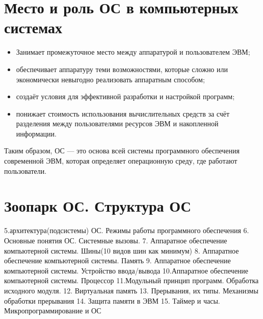 \documentclass[a5paper, 10pt, notitlepage, pdftex,headsepline]{scrartcl}
\begin{document}
\section{Место и роль ОС в компьютерных системах}
  \begin{itemize}
    \item Занимает промежуточное место между аппаратурой и пользователем
      ЭВМ;
    \item обеспечивает аппаратуру теми возможностями, которые сложно или
      экономически невыгодно реализовать аппаратным способом;
    \item создаёт условия для эффективной разработки и настройкой
      программ;
    \item понижает стоимость использования вычислительных средств за
      счёт разделения между пользователями ресурсов ЭВМ и накопленной
      информации.
  \end{itemize}

  Таким образом, ОС --- это основа всей системы программного обеспечения
  современной ЭВМ, которая определяет операционную среду, где работают
  пользователи.
\section{Зоопарк ОС. Структура ОС}
  
5.архитектура(подсистемы) ОС. Режимы работы программного обеспечения
6. Основные понятия ОС. Системные вызовы.
7. Аппаратное обеспечение компьютерной системы. Шины(10 видов шин как
минимум)
8. Аппаратное обеспечение компьютерной системы. Память
9. Аппаратное обеспечение компьютерной системы. Устройство ввода/вывода
10.Аппаратное обеспечение компьютерной системы. Процессор
11.Модульный принцип программ. Обработка исходного модуля.
12. Виртуальная память
13. Прерывания, их типы. Механизмы обработки прерывания
14. Защита памяти в ЭВМ
15. Таймер и часы. Микропрограммирование и ОС
\end{document}
